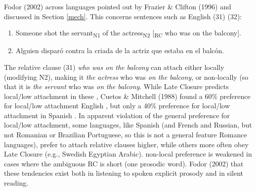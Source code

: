 \documentclass[12pt,oneside]{book}
\providecommand{\tightlist}{%
  \setlength{\itemsep}{0pt}\setlength{\parskip}{0pt}}
\begin{document}
 Fodor (2002)   across languages  pointed out by Frazier \& Clifton (1996) and discussed  in Section \ref{mech}. This concerns sentences such as English (31)  (32):

\begin{enumerate}
\def\labelenumi{(\arabic{enumi})}
\setcounter{enumi}{30}
\tightlist
\item
  Someone shot the servant\textsubscript{N1} of the actress\textsubscript{N2} {[}\textsubscript{RC} who was on the balcony{]}.
\item
  Alguien disparó contra la criada de la actriz que estaba en el balcón.
\end{enumerate}

The relative clause  (31) \emph{who was on the balcony}\added{,} can attach either locally (modifying N2), making it \emph{the actress} who was \emph{on the balcony}, or non-locally (so that it is \emph{the servant} who was \emph{on the balcony}. While Late Closure predicts local/low attachment in these , Cuetos \& Mitchell (1988) found a 60\% preference for local/low attachment  English , but only a 40\% preference for local/low attachment in Spanish . In apparent violation of the general preference for local/low attachment, some languages, like Spanish (and French and Russian, but not Romanian or Brazilian Portuguese, so this is not a general feature  Romance languages), prefer to attach relative clauses higher, while others more often obey Late Closure  (e.g., Swedish Egyptian Arabic).  non-local preference  is weakened in cases where the ambiguous RC is short (one prosodic word). Fodor (2002)  that these tendencies exist both in listening to spoken  explicit prosody\deleted{)} and in silent reading.
\end{document}
